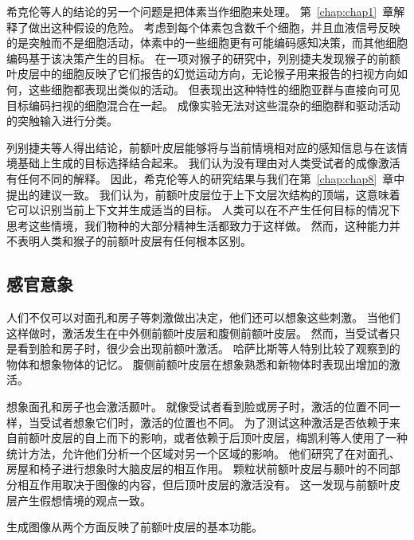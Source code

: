 希克伦等人的结论的另一个问题是把体素当作细胞来处理。
第~\ref{chap:chap1}~章解释了做出这种假设的危险。
考虑到每个体素包含数千个细胞，并且血液信号反映的是突触而不是细胞活动，体素中的一些细胞更有可能编码感知决策，而其他细胞编码基于该决策产生的目标。
在一项对猴子的研究中，列别捷夫\cite{lebedev2001prefrontal}发现猴子的前额叶皮层中的细胞反映了它们报告的幻觉运动方向，无论猴子用来报告的扫视方向如何，这些细胞都表现出类似的活动。
但表现出这种特性的细胞亚群与直接向可见目标编码扫视的细胞混合在一起。
成像实验无法对这些混杂的细胞群和驱动活动的突触输入进行分类。
\par


列别捷夫等人得出结论，前额叶皮层能够将与当前情境相对应的感知信息与在该情境基础上生成的目标选择结合起来。
我们认为没有理由对人类受试者的成像激活有任何不同的解释。
因此，希克伦等人的研究结果与我们在第~\ref{chap:chap8}~章中提出的建议一致。
我们认为，前额叶皮层位于上下文层次结构的顶端，这意味着它可以识别当前上下文并生成适当的目标。
人类可以在不产生任何目标的情况下思考这些情境，我们物种的大部分精神生活都致力于这样做。
然而，这种能力并不表明人类和猴子的前额叶皮层有任何根本区别。



\subsection{感官意象}
\par

人们不仅可以对面孔和房子等刺激做出决定，他们还可以想象这些刺激。
当他们这样做时，激活发生在中外侧前额叶皮层\cite{ishai2000distributed}和腹侧前额叶皮层\cite{ishai2002visual}。
然而，当受试者只是看到脸和房子时，很少会出现前额叶激活。
哈萨比斯等人\cite{hassabis2007using}特别比较了观察到的物体和想象物体的记忆。
腹侧前额叶皮层在想象熟悉和新物体时表现出增加的激活。
\par


想象面孔和房子也会激活颞叶。
就像受试者看到脸或房子时，激活的位置不同一样，当受试者想象它们时，激活的位置也不同\cite{ishai2000distributed}。
为了测试这种激活是否依赖于来自前额叶皮层的自上而下的影响，或者依赖于后顶叶皮层，梅凯利等人\cite{mechelli2004bottom}使用了一种统计方法，允许他们分析一个区域对另一个区域的影响。
他们研究了在对面孔、房屋和椅子进行想象时大脑皮层的相互作用。
颗粒状前额叶皮层与颞叶的不同部分相互作用取决于图像的内容，但后顶叶皮层的激活没有。
这一发现与前额叶皮层产生假想情境的观点一致。
\par


生成图像从两个方面反映了前额叶皮层的基本功能。
\par


